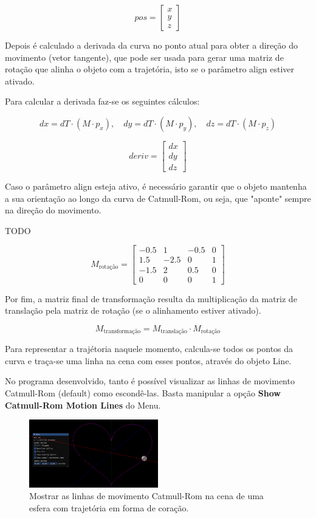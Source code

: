 \documentclass[12pt, a4paper]{article}
\begin{document}
$$
{pos} = \begin{bmatrix} x \\ y \\ z \end{bmatrix}
$$

Depois é calculado a derivada da curva no ponto atual para obter a direção do movimento
(vetor tangente), que pode ser usada para gerar uma matriz de rotação que alinha o objeto
com a trajetória, isto se o parâmetro align estiver ativado.

Para calcular a derivada faz-se os seguintes cálculos:

$$
dx = {dT} \cdot ({M} \cdot {p}_x), \quad
dy = {dT} \cdot ({M} \cdot {p}_y), \quad
dz = {dT} \cdot ({M} \cdot {p}_z)
$$

\[
{deriv} = \begin{bmatrix} dx \\ dy \\ dz \end{bmatrix}
\]

Caso o parâmetro align esteja ativo, é necessário garantir que o objeto mantenha a sua
orientação ao longo da curva de Catmull-Rom, ou seja, que "aponte" sempre na direção do
movimento.

TODO

$$
M_{\text{rotação}} =
\begin{bmatrix}
    -0.5 & 1   & -0.5 & 0 \\
    1.5  & -2.5 & 0    & 1 \\
    -1.5 & 2   & 0.5  & 0 \\
    0  & 0 & 0    & 1
\end{bmatrix}
$$

Por fim, a matriz
final de transformação resulta da multiplicação da matriz de translação pela matriz de
rotação (se o alinhamento estiver ativado).

$$
M_{\text{transformação}} = M_{\text{translação}} \cdot M_{\text{rotação}}
$$

Para representar a trajétoria naquele momento, calcula-se todos os pontos da curva e
traça-se uma linha na cena com esses pontos, através do objeto Line.

No programa desenvolvido, tanto é possível visualizar as linhas de movimento Catmull-Rom (default)
como escondê-las. Basta manipular a opção \textbf{Show Catmull-Rom Motion Lines} do Menu.

\begin{figure}[H]
    \centering
    \includegraphics[width=0.5\textwidth]{res/phase3/ShowCatmullRomMotionLines.png}
    \caption{Mostrar as linhas de movimento Catmull-Rom na cena de
    uma esfera com trajetória em forma de coração.}
\end{figure}
\end{document}

